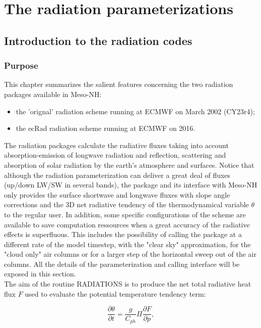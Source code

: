 \chapter{The radiation parameterizations}\label{RADIATIONS}
\minitoc
%
\section{Introduction to the radiation codes}
%
\subsection{Purpose}
%

This chapter summarizes the salient features concerning 
the two radiation packages available in Meso-NH:
\begin{itemize}
\item the 'orignal' radiation scheme running at ECMWF on March 2002 (CY23r4);
\item the ecRad radiation scheme running at ECMWF on 2016.
\end{itemize}

The radiation packages calculate the radiative fluxes taking into account
absorption-emission of longwave radiation and reflection, scattering and
absorption of solar radiation by the earth's atmosphere and surfaces.
Notice that although the radiation parameterization
can deliver a great deal of fluxes (up/down LW/SW in several bands), the
package and its interface with Meso-NH only provides the
surface shortwave and longwave fluxes with slope angle corrections and the 3D
net radiative tendency of the thermodynamical variable $\theta$ to the regular
user. In addition, some specific configurations of the scheme are available to save
computation ressources when a great accuracy of the radiative effects is
superfluous. This includes the possibility of calling the package at a different
rate of the model timestep, with the "clear sky" approximation, for the "cloud
only" air columns or for a larger step of the horizontal sweep out of the air
columns. All the details of the parameterization and calling interface will be
exposed in this section.\\

The aim of the routine RADIATIONS is to produce the net total radiative heat
flux $F$ used to evaluate the potential temperature tendency term:

$$\frac{\partial \theta}{\partial t} = \frac{g}{C_{ph}}\Pi \frac{\partial F}{\partial p}, $$

